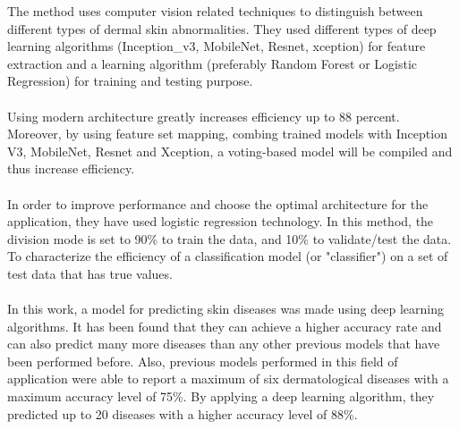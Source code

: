  The method uses computer vision related techniques to distinguish between different types of dermal skin abnormalities. They used different types of deep learning algorithms (Inception\_v3, MobileNet, Resnet, xception) for feature extraction and a learning algorithm (preferably Random Forest or Logistic Regression) for training and testing purpose.\\\\
 
 Using modern architecture greatly increases efficiency up to 88 percent. Moreover, by using feature set mapping, combing trained models with Inception V3, MobileNet, Resnet and Xception, a voting-based model will be compiled and thus increase efficiency.\\\\
 
 In order to improve performance and choose the optimal architecture for the application, they have used logistic regression technology. In this method, the division mode is set to 90\% to train the data, and 10\% to validate/test the data. To characterize the efficiency of a classification model (or "classifier") on a set of test data that has true values.\\\\
In this work, a model for predicting skin diseases was made using deep learning algorithms. It has been found that they can achieve a higher accuracy rate and can also predict many more diseases than any other previous models that have been performed before. Also, previous models performed in this field of application were able to report a maximum of six dermatological diseases with a maximum accuracy level of 75\%. By applying a deep learning algorithm, they predicted up to 20 diseases with a higher accuracy level of 88\%.

